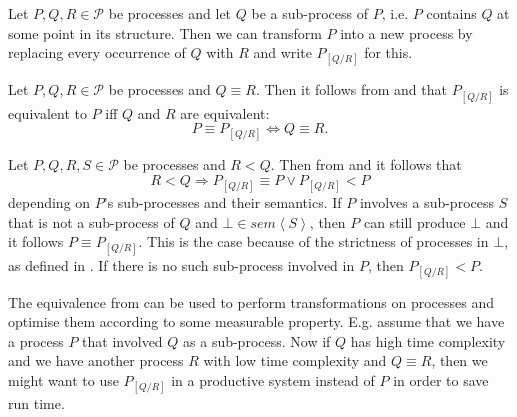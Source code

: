 \begin{definition}
\label{def:process_substitution}
Let $P, Q, R \in \mathcal{P}$ be processes and let $Q$ be a sub-process of $P$, i.e. $P$ contains $Q$ at some point in its structure. Then we can transform $P$ into a new process by replacing every occurrence of $Q$ with $R$ and write $P_{\left[ Q / R \right]}$ for this.

\hfill\qedsymbol
\end{definition}



\begin{corollary}
\label{crl:process_substitution}
Let $P, Q, R \in \mathcal{P}$ be processes and $Q \equiv R$. Then it follows from  and  that $P_{\left[ Q / R \right]}$ is equivalent to $P$ iff $Q$ and $R$ are equivalent:
  \begin{equation}
    P \equiv P_{\left[ Q / R \right]} \Leftrightarrow Q \equiv R.
  \end{equation}
  \hfill\qedsymbol
\end{corollary}

\begin{corollary}
Let $P, Q, R, S \in \mathcal{P}$ be processes and $R < Q$. Then from  and  it follows that
  \begin{equation}
    R < Q \Rightarrow P_{\left[ Q / R \right]} \equiv P \lor P_{\left[ Q / R \right]} < P
  \end{equation}
  depending on $P$'s sub-processes and their semantics. If $P$ involves a sub-process $S$ that is not a sub-process of $Q$ and $\bot \in sem \left\langle S \right\rangle$, then $P$ can still produce $\bot$ and it follows $P \equiv P_{\left[Q / R \right]}$. This is the case because of the strictness of processes in $\bot$, as defined in . If there is no such sub-process involved in $P$, then $P_{\left[Q / R \right]} < P$.
    
  \hfill\qedsymbol
\end{corollary}

The equivalence from  can be used to perform transformations on processes and optimise them according to some measurable property. E.g. assume that we have a process $P$ that involved $Q$ as a sub-process. Now if $Q$ has high time complexity and we have another process $R$ with low time complexity and $Q \equiv R$, then we might want to use $P_{\left[ Q / R \right]}$ in a productive system instead of $P$ in order to save run time.


